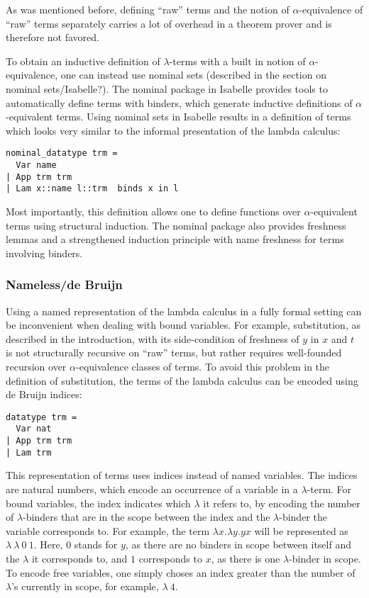 \documentclass[a4paper, 12pt, twoside]{style/ociamthesis}
\begin{document}
As was mentioned before, defining ``raw'' terms and the notion of
\(\alpha\)-equivalence of ``raw'' terms separately carries a lot of
overhead in a theorem prover and is therefore not favored.

To obtain an inductive definition of \(\lambda\)-terms with a built in
notion of \(\alpha\)-equivalence, one can instead use nominal sets
(described in the section on nominal sets/Isabelle?). The nominal
package in Isabelle provides tools to automatically define terms with
binders, which generate inductive definitions of \(\alpha\)-equivalent
terms. Using nominal sets in Isabelle results in a definition of terms
which looks very similar to the informal presentation of the lambda
calculus:

\begin{verbatim}
nominal_datatype trm =
  Var name
| App trm trm
| Lam x::name l::trm  binds x in l
\end{verbatim}

Most importantly, this definition allows one to define functions over
\(\alpha\)-equivalent terms using structural induction. The nominal
package also provides freshness lemmas and a strengthened induction
principle with name freshness for terms involving binders.

\subsubsection{Nameless/de Bruijn}\label{namelessde-bruijn}

Using a named representation of the lambda calculus in a fully formal
setting can be inconvenient when dealing with bound variables. For
example, substitution, as described in the introduction, with its
side-condition of freshness of \(y\) in \(x\) and \(t\) is not
structurally recursive on ``raw'' terms, but rather requires
well-founded recursion over \(\alpha\)-equivalence classes of terms. To
avoid this problem in the definition of substitution, the terms of the
lambda calculus can be encoded using de Bruijn indices:

\begin{verbatim}
datatype trm =
  Var nat
| App trm trm
| Lam trm
\end{verbatim}

This representation of terms uses indices instead of named variables.
The indices are natural numbers, which encode an occurrence of a
variable in a \(\lambda\)-term. For bound variables, the index indicates
which \(\lambda\) it refers to, by encoding the number of
\(\lambda\)-binders that are in the scope between the index and the
\(\lambda\)-binder the variable corresponds to. For example, the term
\(\lambda x.\lambda y. yx\) will be represented as
\(\lambda\ \lambda\ 0\ 1\). Here, 0 stands for \(y\), as there are no
binders in scope between itself and the \(\lambda\) it corresponds to,
and \(1\) corresponds to \(x\), as there is one \(\lambda\)-binder in
scope. To encode free variables, one simply choses an index greater than
the number of \(\lambda\)'s currently in scope, for example,
\(\lambda\ 4\).
\end{document}
